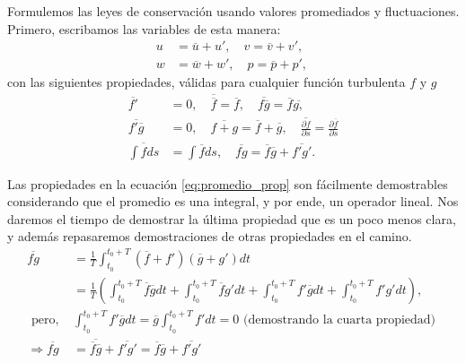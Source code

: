 Formulemos las leyes de conservación usando valores promediados y fluctuaciones.
Primero, escribamos las variables de esta manera:
%
\begin{align}
u &= \overline{u} + u',\quad v = \overline{v} + v',\nonumber\\
w &= \overline{w} + w',\quad p = \overline{p} + p',\
\end{align}
%
con las siguientes propiedades, válidas para cualquier función turbulenta $f$ y $g$
%
\begin{align}\label{eq:promedio_prop}
\overline{f'} &= 0, \quad \overline{\overline{f}}=\overline{f},\quad \overline{f\overline{g}}=\overline{f}\overline{g,} \nonumber\\
\overline{f'\overline{g}} &= 0,\quad \overline{f+g} = \overline{f} +\overline{g},\quad \overline{\frac{\partial f}{\partial s}} = \frac{\partial\overline{f}}{\partial s} \nonumber\\
\overline{\int f ds} &= \int\overline{f}ds,\quad \overline{fg} = \overline{f}\overline{g}+\overline{f'g'}.
\end{align}

Las propiedades en la ecuación \eqref{eq:promedio_prop} son fácilmente demostrables considerando que el promedio es una integral, y por ende, un operador lineal.
Nos daremos el tiempo de demostrar la última propiedad que es un poco menos clara, y además repasaremos demostraciones de otras propiedades en el camino.
%
\begin{align}
\overline{fg} &= \frac{1}{T}\int_{t_0}^{t_0+T}(\overline{f}+f')(\overline{g}+g')dt\nonumber\\
             &= \frac{1}{T}\left(\int_{t_0}^{t_0+T} \overline{f}\overline{g}dt + \int_{t_0}^{t_0+T} \overline{f}g'dt +\int_{t_0}^{t_0+T} f'\overline{g}dt + \int_{t_0}^{t_0+T}f'g'dt\right), \nonumber\\
\text{ pero, }&\int_{t_0}^{t_0+T} f'\overline{g}dt = \overline{g}\int_{t_0}^{t_0+T} f'dt = 0 \text{ (demostrando la cuarta propiedad) }\nonumber\\
\Rightarrow\overline{fg} &= \overline{\overline{f}\overline{g}} + \overline{f'g'} = \overline{f}\overline{g} + \overline{f'g'}
\end{align}

